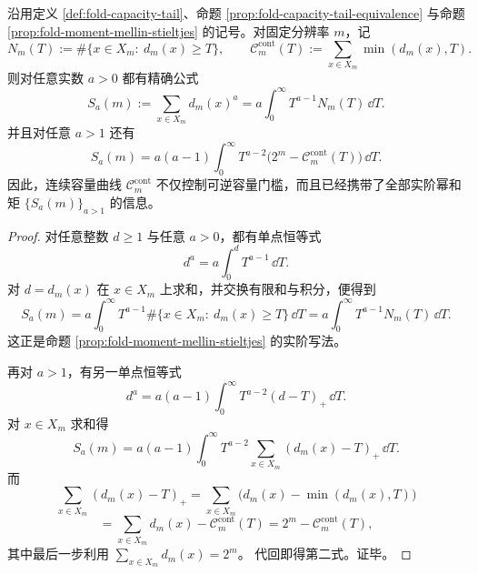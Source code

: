 \begin{theorem}\label{thm:xi-time-part57b-capacity-moment-exact-mellin-stieltjes}
沿用定义 \ref{def:fold-capacity-tail}、命题 \ref{prop:fold-capacity-tail-equivalence} 与命题
\ref{prop:fold-moment-mellin-stieltjes} 的记号。对固定分辨率 \(m\)，记
\[
N_m(T):=\#\{x\in X_m:\ d_m(x)\ge T\},
\qquad
\mathcal C_m^{\mathrm{cont}}(T):=\sum_{x\in X_m}\min(d_m(x),T).
\]
则对任意实数 \(a>0\) 都有精确公式
\[
\boxed{\;
S_a(m):=\sum_{x\in X_m}d_m(x)^a
=
a\int_0^\infty T^{a-1}N_m(T)\,\dd T.\;}
\]
并且对任意 \(a>1\) 还有
\[
\boxed{\;
S_a(m)
=
a(a-1)\int_0^\infty
T^{a-2}\bigl(2^m-\mathcal C_m^{\mathrm{cont}}(T)\bigr)\,\dd T.\;}
\]
因此，连续容量曲线 \(\mathcal C_m^{\mathrm{cont}}\) 不仅控制可逆容量门槛，而且已经携带了全部实阶幂和矩 \(\{S_a(m)\}_{a>1}\) 的信息。
\end{theorem}
\begin{proof}
对任意整数 \(d\ge 1\) 与任意 \(a>0\)，都有单点恒等式
\[
d^a=a\int_0^d T^{a-1}\,\dd T.
\]
对 \(d=d_m(x)\) 在 \(x\in X_m\) 上求和，并交换有限和与积分，便得到
\[
S_a(m)=a\int_0^\infty T^{a-1}\#\{x\in X_m:\ d_m(x)\ge T\}\,\dd T
=
a\int_0^\infty T^{a-1}N_m(T)\,\dd T.
\]
这正是命题 \ref{prop:fold-moment-mellin-stieltjes} 的实阶写法。

再对 \(a>1\)，有另一单点恒等式
\[
d^a=a(a-1)\int_0^\infty T^{a-2}(d-T)_+\,\dd T.
\]
对 \(x\in X_m\) 求和得
\[
S_a(m)=
a(a-1)\int_0^\infty
T^{a-2}\sum_{x\in X_m}(d_m(x)-T)_+\,\dd T.
\]
而
\[
\sum_{x\in X_m}(d_m(x)-T)_+
=
\sum_{x\in X_m}\bigl(d_m(x)-\min(d_m(x),T)\bigr)
\]
\[
=
\sum_{x\in X_m}d_m(x)-\mathcal C_m^{\mathrm{cont}}(T)
=
2^m-\mathcal C_m^{\mathrm{cont}}(T),
\]
其中最后一步利用
\(
\sum_{x\in X_m}d_m(x)=2^m
\)。
代回即得第二式。证毕。
\end{proof}

